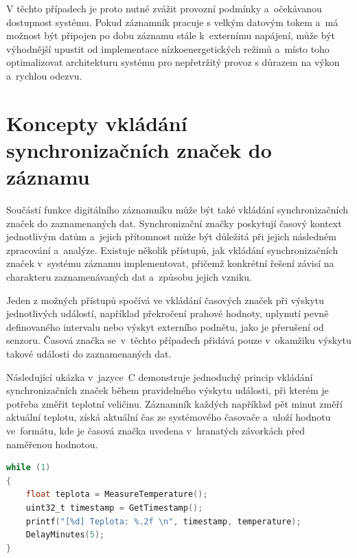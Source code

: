 V těchto případech je proto nutné zvážit provozní podmínky a~očekávanou dostupnost systému. Pokud záznamník pracuje s velkým datovým tokem a~má možnost být připojen po dobu záznamu stále k~externímu napájení, může být výhodnější upustit od implementace nízkoenergetických režimů a~místo toho optimalizovat architekturu systému pro nepřetržitý provoz s důrazem na výkon a~rychlou odezvu.~\cite{analog_devices_low_power_modes}


\section{Koncepty vkládání synchronizačních značek do záznamu} 
\label{casove_znacky}
Součástí funkce digitálního záznamníku může být také vkládání synchronizačních značek do zaznamenaných dat. Synchronizační značky poskytují časový kontext jednotlivým datům a~jejich přítomnost může být důležitá při jejich následném zpracování a~analýze. Existuje několik přístupů, jak vkládání synchronizačních značek v~systému záznamu implementovat, přičemž konkrétní řešení závisí na charakteru zaznamenávaných dat a~způsobu jejich vzniku.~\cite{researchgate_general_dataloggger_multiple_sdcards}

Jeden z možných přístupů spočívá ve vkládání časových značek při výskytu jednotlivých událostí, například překročení prahové hodnoty, uplynutí pevně definovaného intervalu nebo výskyt externího podnětu, jako je přerušení od senzoru. Časová značka se~v~těchto případech přidává pouze v~okamžiku výskytu takové události do zaznamenaných dat.~\cite{datalogger_implementation_temperature, researchgate_general_dataloggger_multiple_sdcards, ieee_multi_connectivity_datalogger_sd_card}

Následující ukázka v~jazyce~C demonstruje jednoduchý princip vkládání synchronizačních značek během pravidelného výskytu události, při kterém je potřeba změřit teplotní veličinu. Záznamník každých například pět minut změří aktuální teplotu, získá aktuální čas ze systémového časovače a~uloží hodnotu ve~formátu, kde je časová značka uvedena v~hranatých závorkách před naměřenou hodnotou.~\cite{datalogger_implementation_temperature}

\begin{lstlisting}[language=C, caption={Vkládání časové značky zaznamenané události}]
while (1)
{
    float teplota = MeasureTemperature();
    uint32_t timestamp = GetTimestamp();
    printf("[%d] Teplota: %.2f \n", timestamp, temperature);
    DelayMinutes(5);
}
\end{lstlisting}

